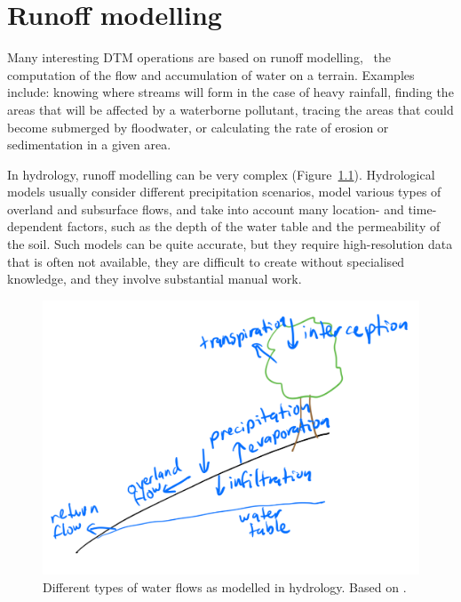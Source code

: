 

\setchapterpreamble[u]{\margintoc}

\graphicspath{{runoff/}}


\chapter{Runoff modelling}%
\label{chap:runoff}

Many interesting DTM operations are based on runoff modelling, \ie\ the computation of the flow and accumulation of water on a terrain.
Examples include: knowing where streams will form in the case of heavy rainfall, finding the areas that will be affected by a waterborne pollutant, tracing the areas that could become submerged by floodwater, or calculating the rate of erosion or sedimentation in a given area.

In hydrology, runoff modelling can be very complex (Figure~\ref{fig:hydrology}).
Hydrological models usually consider different precipitation scenarios, model various types of overland and subsurface flows, and take into account many location- and time-dependent factors, such as the depth of the water table and the permeability of the soil.
Such models can be quite accurate, but they require high-resolution data that is often not available, they are difficult to create without specialised knowledge, and they involve substantial manual work.

\begin{figure}
\centering
\includegraphics[width=0.95\linewidth]{figs/hydrology.pdf}
\caption{Different types of water flows as modelled in hydrology. Based on \citet{Beven12}.}%
\label{fig:hydrology}
\end{figure}

